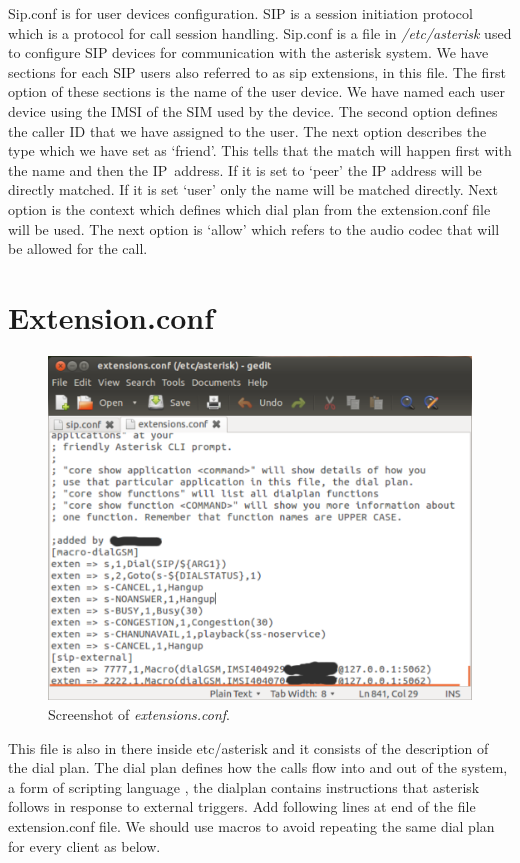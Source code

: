 Sip.conf is for user devices configuration. SIP is a session initiation
protocol which is a protocol for call session handling. Sip.conf is a file in
\emph{/etc/asterisk} used to configure SIP devices for communication with the
asterisk system. We have sections for each SIP users also referred to as sip
extensions, in this file. The first option of these sections is the name of
the user device. We have named each user device using the IMSI of the SIM used
by the device. The second option defines the caller ID that we have assigned
to the user. The next option describes the type which we have set as ‘friend’.
This tells that the match will happen first with the name and then the
IP~address. If it is set to ‘peer’ the IP address will be directly matched.
If it is set ‘user’ only the name will be matched directly. Next option is the
context which defines which dial plan from the extension.conf file will be
used. The next option is ‘allow’ which refers to the audio codec that will be
allowed for the call. 

\section{Extension.conf}

\begin{figure}
  \centering
    \includegraphics[width=\textwidth]{../images/ext_conf}
  \caption[extensions.conf]{Screenshot of \emph{extensions.conf}.}
  \label{ext_conf}
\end{figure}

This file is  also in there inside etc/asterisk and it consists of the
description of the dial plan. The dial plan defines how the calls flow into
and out of the system, a form of scripting language , the dialplan contains
instructions that asterisk follows in response to external triggers. 
Add following lines at end of the file extension.conf file. We should use
macros to avoid repeating the same dial plan for every client as below.



